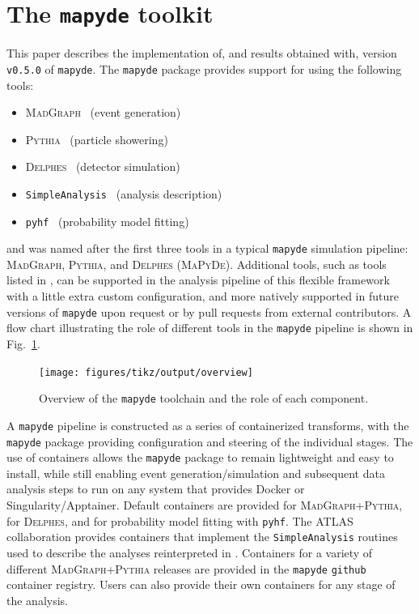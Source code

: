 \documentclass{article}
\newcommand{\mapyde}{\texttt{mapyde}}
\newcommand{\simpleanalysis}{\texttt{SimpleAnalysis}}
\newcommand{\madgraph}{\textsc{MadGraph}}
\newcommand{\pythia}{\textsc{Pythia}}
\newcommand{\delphes}{\textsc{Delphes}}
\newcommand{\pyhf}{\texttt{pyhf}}
\begin{document}
\section{The \mapyde{} toolkit}
\label{sec:the-toolkit}

This paper describes the implementation of, and results obtained with, version \texttt{v0.5.0} of \mapyde.  The \mapyde{} package provides support for using the following tools:

\begin{itemize}
	\item \madgraph~\cite{Alwall:2014hca,Frederix:2018nkq} (event generation)
	\item \pythia~\cite{Bierlich:2022pfr} (particle showering)
	\item \delphes~\cite{deFavereau:2013fsa,Selvaggi:2014mya,Mertens:2015kba} (detector simulation)
	\item \simpleanalysis~\cite{simpleanalysis,atlas_simpleanalysis} (analysis description)
	\item \pyhf~\cite{pyhf,pyhf_joss} (probability model fitting)
\end{itemize}

and was named after the first three tools in a typical \mapyde{} simulation pipeline: \madgraph, \pythia, and \delphes{} (\textsc{MaPyDe}).  Additional tools, such as tools listed in , can be supported in the analysis pipeline of this flexible framework with a little extra custom configuration, and more natively supported in future versions of \mapyde{} upon request or by pull requests from external contributors.  A flow chart illustrating the role of different tools in the \mapyde{} pipeline is shown in Fig.~\ref{fig:mapydeoverview}.

\begin{figure}[tbp]
	\centering
	\texttt{[image: figures/tikz/output/overview]}
	\caption{Overview of the \mapyde{} toolchain and the role of each component.}
	\label{fig:mapydeoverview}
\end{figure}

A \mapyde{} pipeline is constructed as a series of containerized transforms, with the \mapyde{} package providing configuration and steering of the individual stages.  The use of containers allows the \mapyde{} package to remain lightweight and easy to install, while still enabling event generation/simulation and subsequent data analysis steps to run on any system that provides Docker or Singularity/Apptainer.  Default containers are provided for \madgraph+\pythia, for \delphes, and for probability model fitting with \pyhf.  The ATLAS collaboration provides containers that implement the \simpleanalysis{} routines used to describe the analyses reinterpreted in .  Containers for a variety of different \madgraph+\pythia{} releases are provided in the \mapyde{} \texttt{github} container registry.  Users can also provide their own containers for any stage of the analysis.
\end{document}
